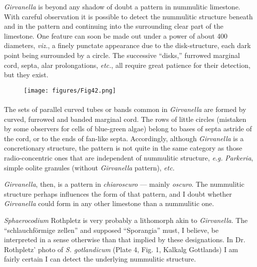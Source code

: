 \documentclass[a4paper, 12pt, oneside]{article}
\begin{document}
\emph{Girvanella} is beyond any shadow of doubt a pattern in nummulitic limestone. With careful observation it is possible to detect the nummulitic structure beneath and in the pattern and continuing into the surrounding clear part of the limestone. One feature can soon be made out under a power of about 400 diameters, \emph{viz.}, a finely punctate appearance due to the disk-structure, each dark point being surrounded by a circle. The successive ``disks,'' furrowed marginal cord, septa, alar prolongations, \emph{etc.}, all require great patience for their detection, but they exist.
\begin{figure}[H]
\centering
\texttt{[image: figures/Fig42.png]}
\caption*{}
\end{figure}
\paragraph{}
The sets of parallel curved tubes or bands common in \emph{Girvanella} are formed by curved, furrowed and banded marginal cord. The rows of little circles (mistaken by some observers for cells of blue-green algae) belong to bases of septa astride of the cord, or to the ends of fan-like septa. Accordingly, although \emph{Girvanella} is a concretionary structure, the pattern is not quite in the same category as those radio-concentric ones that are independent of nummulitic structure, \emph{e.g.} \emph{Parkeria}, simple oolite granules (without \emph{Girvanella} pattern), \emph{etc.}

\emph{Girvanella}, then, is a pattern in \emph{chiaroscuro} --- mainly \emph{oscuro}. The nummulitic structure perhaps influences the form of that pattern, and I doubt whether \emph{Girvanella} could form in any other limestone than a nummulitic one.

\emph{Sphaerocodium} Rothpletz is very probably a lithomorph akin to \emph{Girvanella}. The ``schlauchförmige zellen'' and supposed ``Sporangia'' must, I believe, be interpreted in a sense otherwise than that implied by these designations. In Dr. Rothpletz' photo of \emph{S. gotlandicum} (Plate 4, Fig. 1, Kalkalg Gottlands) I am fairly certain I can detect the underlying nummulitic structure.
\end{document}
